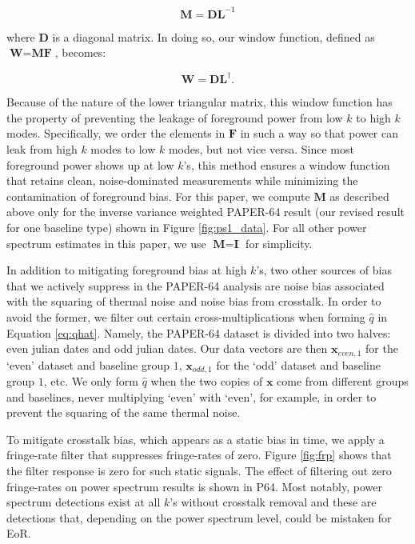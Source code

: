\documentclass[preprint2,numberedappendix,tighten]{aastex6}  %
\begin{document}
\begin{equation}
\textbf{M} = \textbf{DL}^{-1}
\end{equation}

\noindent where $\textbf{D}$ is a diagonal matrix. In doing so, our window function, defined as $\textbf{W} = \textbf{MF}$, 
becomes:

\begin{equation}
\textbf{W} = \textbf{DL}^{\dagger}.
\end{equation}

\noindent Because of the nature of the lower triangular matrix, this window function has the property of preventing the leakage 
of foreground power from low $k$ to high $k$ modes. Specifically, we order the elements in $\textbf{F}$ in such a way so that 
power can leak from high $k$ modes to low $k$ modes, but not vice versa. Since most foreground power shows up at low 
$k$'s, this method ensures a window function that retains clean, noise-dominated measurements while minimizing the 
contamination of foreground bias. For this paper, we compute $\textbf{M}$ as described above only for the inverse variance weighted PAPER-64 result (our revised result for one baseline type) shown in Figure \ref{fig:ps1_data}. For all other power spectrum estimates in this paper, we use $\textbf{M}=\textbf{I}$ for simplicity.

In addition to mitigating foreground bias at high $k$'s, two other sources of bias that we actively suppress in the PAPER-64 
analysis are noise bias associated with the squaring of thermal noise and noise bias from crosstalk. In order to avoid the 
former, we filter out certain cross-multiplications when forming $\hat{q}$ in Equation \eqref{eq:qhat}. Namely, the PAPER-64 
dataset is divided into two halves: even julian dates and odd julian dates. Our data vectors are then $\textbf{x}_{even, 1}$ for 
the `even' dataset and baseline group $1$, $\textbf{x}_{odd, 1}$ for the `odd' dataset and baseline group $1$, etc. We only form 
$\hat{q}$ when the two copies of $\textbf{x}$ come from different groups and baselines, never multiplying `even' with `even', for 
example, in order to prevent the squaring of the same thermal noise.

To mitigate crosstalk bias, which appears as a static bias in time, we apply a fringe-rate filter that suppresses fringe-rates of 
zero. Figure \ref{fig:frp} shows that the filter response is zero for such static signals. The effect of filtering out zero fringe-rates 
on power spectrum results is shown in P64. Most notably, power spectrum detections exist at all $k$'s without crosstalk 
removal and these are detections that, depending on the power spectrum level, could be mistaken for EoR. 
\end{document}
